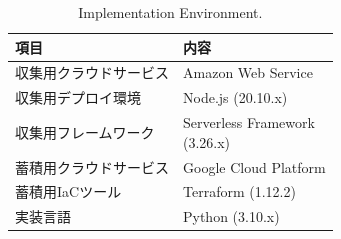 
\begin{table}[htbp]
    \centering
    \caption{Implementation Environment.}
    \begin{tabular}{ll}
        \hline
        項目          & 内容                                             \\
        \hline
        \hline
        収集用クラウドサービス & Amazon Web Service                             \\
        収集用デプロイ環境   & Node.js (20.10.x)                              \\
        収集用フレームワーク  & \makecell[l]{Serverless Framework \\ (3.26.x)} \\
        蓄積用クラウドサービス & Google Cloud Platform                          \\
        蓄積用IaCツール   & Terraform (1.12.2)                             \\
        実装言語        & Python (3.10.x)                                \\
        \hline
    \end{tabular}
    \label{tab:implementation_environment}
\end{table}